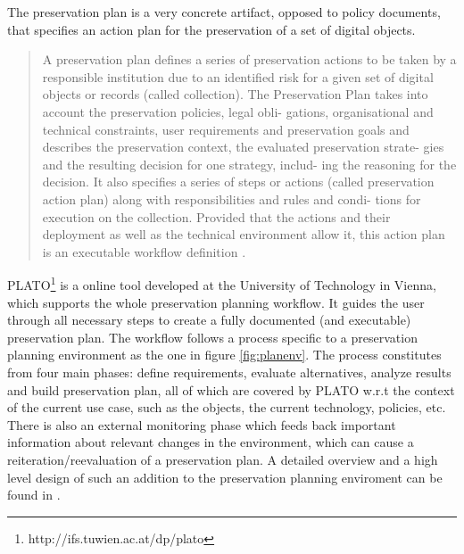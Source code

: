 The preservation plan is a very concrete artifact, opposed to policy documents, that specifies an action plan for the preservation of a set of digital objects.
\begin{quote}
A preservation plan defines a series of preservation actions to be taken by a responsible institution due to an identified risk for a given set of digital objects or records (called collection). The Preservation Plan takes into account the preservation policies, legal obli- gations, organisational and technical constraints, user requirements and preservation goals and describes the preservation context, the evaluated preservation strate- gies and the resulting decision for one strategy, includ- ing the reasoning for the decision. It also specifies a series of steps or actions (called preservation action plan) along with responsibilities and rules and condi- tions for execution on the collection. Provided that the actions and their deployment as well as the technical environment allow it, this action plan is an executable workflow definition \cite{Becker:2009fk}.
\end{quote}

PLATO\footnote{http://ifs.tuwien.ac.at/dp/plato} is a online tool developed at the University of Technology in Vienna, which supports the whole preservation planning workflow.
It guides the user through all necessary steps to create a fully documented (and executable) preservation plan. The workflow follows a process specific to a preservation planning environment as the one in figure \ref{fig:planenv}. The process constitutes from four main phases: define requirements, evaluate alternatives, analyze results and build preservation plan, all of which are covered by PLATO w.r.t the context of the current use case, such as the objects, the current technology, policies, etc.
There is also an external monitoring phase which feeds back important information about relevant changes in the environment, which can cause a reiteration/reevaluation of a preservation plan. A detailed overview and a high level design of such an addition to the preservation planning enviroment can be found in \cite{duretec:2012:watch}.

